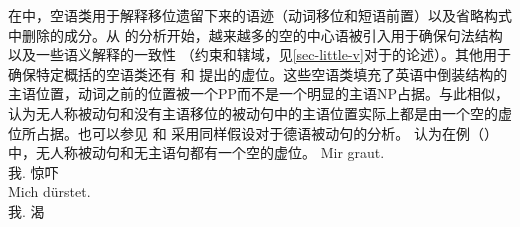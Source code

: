 在\gbtc 中，空语类用于解释移位遗留下来的语迹（动词移位和短语前置）以及省略构式中删除的成分。从 \citet{Larson88a}的分析开始，越来越多的空的中心语被引入用于确保句法结构以及一些语义解释的一致性 （约束和辖域，见\ref{sec-little-v}对于\littlevc 的论述）。其他用于确保特定概括的空语类还有 \citet[]{Coopmans-89a-u}和 \citet[\S~1]{Postal2004a-u}提出的虚位。这些空语类填充了英语中倒装结构的主语位置，动词之前的位置被一个PP而不是一个明显的主语NP占据。与此相似， \citet[]{Grewendorf93}认为无人称被动句和没有主语移位的被动句中的主语位置实际上都是由一个空的虚位所占据。也可以参见 和 \citet[]{Lohnstein2014a}采用同样假设对于德语被动句的分析。 \citet[\S~II.3.3.3]{Sternefeld2006a-u}认为在例（）中，无人称被动句和无主语句都有一个空的虚位。
\eal
\ex 
\gll Mir graut.\\
	 我.\dat{} 惊吓\\
\ex 
\gll Mich dürstet.\\
	我.\acc{} 渴\\
\zl

